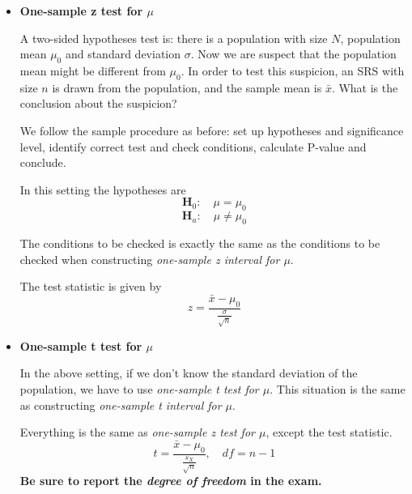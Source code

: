 \documentclass[a4paper, 12pt,twoside]{book}
\begin{document}
\begin{itemize}
\item \textbf{One-sample z test for $\mu$}\vspace{0.3cm}

 A two-sided hypotheses test is: there is a population with size $N$, population mean $\mu_0$ and standard deviation $\sigma$. Now we are suspect that the population mean might be different from $\mu_0$. In order to test this suspicion, an SRS with size $n$ is drawn from the population, and the sample mean is $\bar{x}$. What is the conclusion about the suspicion?\vspace{0.3cm}
 
 We follow the sample procedure as before: set up hypotheses and significance level, identify correct test and check conditions, calculate P-value and conclude.\vspace{0.3cm}
 
 In this setting the hypotheses are
 $$\textbf{H}_0: \quad \mu = \mu_0$$
  $$\textbf{H}_a: \quad \mu \ne \mu_0$$
 
 The conditions to be checked is exactly the same as the conditions to be checked when constructing \textit{one-sample z interval for $\mu$}.
 
 The test statistic is given by 
 $$z=\frac{\bar{x}-\mu_0}{\frac{\sigma}{\sqrt{n}}}$$
 
 \item \textbf{One-sample t test for $\mu$}\vspace{0.3cm}
 
 In the above setting, if we don't know the standard deviation of the population, we have to use \textit{one-sample t test for $\mu$}. This situation is the same as constructing \textit{one-sample t interval for $\mu$}.\vspace{0.3cm}
 
Everything is the same as \textit{one-sample z test for $\mu$}, except the test statistic. 
 $$t=\frac{\bar{x}-\mu_0}{\frac{s_X}{\sqrt{n}}}, \quad df = n-1$$
 \textbf{Be sure to report the \textit{degree of freedom} in the exam.}\vspace{0.3cm}
\end{itemize}
\newpage
\end{document}
